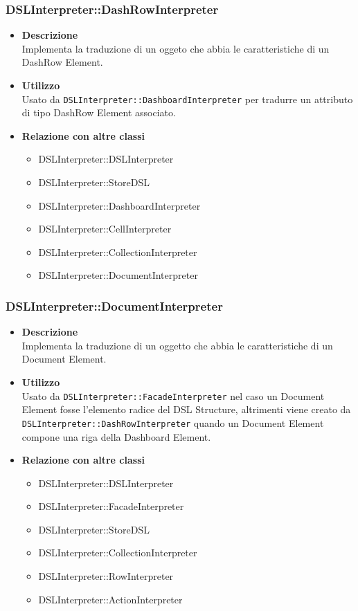 \subsubsection{DSLInterpreter::DashRowInterpreter}
\begin{itemize}
\item \textbf{Descrizione} \hfill \\
Implementa la traduzione di un oggeto che abbia le caratteristiche di un DashRow Element.
\item \textbf{Utilizzo} \hfill \\
Usato da \texttt{DSLInterpreter::DashboardInterpreter} per tradurre un attributo di tipo DashRow Element associato.
\item \textbf{Relazione con altre classi}
\begin{itemize}
\item DSLInterpreter::DSLInterpreter
\item DSLInterpreter::StoreDSL
\item DSLInterpreter::DashboardInterpreter
\item DSLInterpreter::CellInterpreter
\item DSLInterpreter::CollectionInterpreter
\item DSLInterpreter::DocumentInterpreter
\end{itemize}
\end{itemize}

\subsubsection{DSLInterpreter::DocumentInterpreter}
\begin{itemize}
\item \textbf{Descrizione} \hfill \\
  Implementa la traduzione di un oggetto che abbia le caratteristiche di un Document Element.
\item \textbf{Utilizzo} \hfill \\
Usato da \texttt{DSLInterpreter::FacadeInterpreter} nel caso un Document Element fosse l'elemento radice del DSL Structure, altrimenti viene creato da \texttt{DSLInterpreter::DashRowInterpreter} quando un Document Element compone una riga della Dashboard Element.
\item \textbf{Relazione con altre classi}
  \begin{itemize}
  \item DSLInterpreter::DSLInterpreter
  \item DSLInterpreter::FacadeInterpreter
  \item DSLInterpreter::StoreDSL
  \item DSLInterpreter::CollectionInterpreter
  \item DSLInterpreter::RowInterpreter
  \item DSLInterpreter::ActionInterpreter
  \end{itemize}
\end{itemize}

